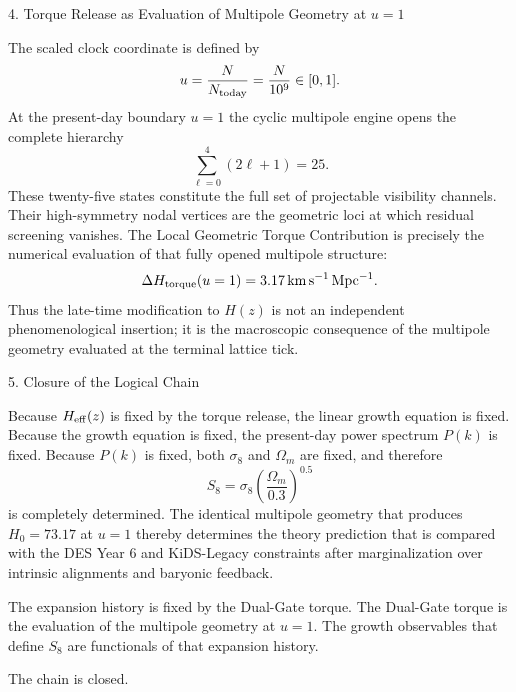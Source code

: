 4. Torque Release as Evaluation of Multipole Geometry at \(u=1\)

The scaled clock coordinate is defined by
\[
u=\frac{N}{N_{\rm today}}=\frac{N}{10^9}\in[0,1].
\]  
At the present-day boundary \(u=1\) the cyclic multipole engine opens the complete hierarchy
\[
\sum_{\ell=0}^{4}(2\ell+1)=25.
\]  
These twenty-five states constitute the full set of projectable visibility channels. Their high-symmetry nodal vertices are the geometric loci at which residual screening vanishes. The Local Geometric Torque Contribution is precisely the numerical evaluation of that fully opened multipole structure:
\[
\Delta H_{\rm torque}(u=1)=3.17\,\mathrm{km\,s^{-1}\,Mpc^{-1}}.
\]  
Thus the late-time modification to \(H(z)\) is not an independent phenomenological insertion; it is the macroscopic consequence of the multipole geometry evaluated at the terminal lattice tick.

5. Closure of the Logical Chain

Because \(H_{\rm eff}(z)\) is fixed by the torque release, the linear growth equation is fixed. Because the growth equation is fixed, the present-day power spectrum \(P(k)\) is fixed. Because \(P(k)\) is fixed, both \(\sigma_8\) and \(\Omega_m\) are fixed, and therefore
\[
S_8=\sigma_8\left(\frac{\Omega_m}{0.3}\right)^{0.5}
\]  
is completely determined. The identical multipole geometry that produces \(H_0=73.17\) at \(u=1\) thereby determines the theory prediction that is compared with the DES Year 6 and KiDS-Legacy constraints after marginalization over intrinsic alignments and baryonic feedback.

The expansion history is fixed by the Dual-Gate torque.  
The Dual-Gate torque is the evaluation of the multipole geometry at \(u=1\).  
The growth observables that define \(S_8\) are functionals of that expansion history.  

The chain is closed.
